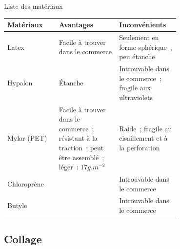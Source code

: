 \begin{frame}{Liste des matériaux}
	\begin{tabular}{|l|p{0.35\linewidth}|p{0.35\linewidth}|}
		\hline
		Matériaux & Avantages & Inconvénients \\
		\hline

		\rowcolor{OrangeT}
		Latex &
		Facile à trouver dans le commerce &
		Seulement en forme sphérique~; peu étanche \\
		\hline

		\rowcolor{RedT}
		Hypalon & Étanche & Introuvable dans le commerce~; fragile aux ultraviolets \\
		\hline

		\rowcolor{GreenT}
		Mylar (PET) &
		Facile à trouver dans le commerce~; résistant à la traction~; peut être assemblé~; léger~: $17 g.m^{-2}$ &
		Raide~; fragile au cisaillement et à la perforation \\
		\hline

		\rowcolor{RedT}
		Chloroprène &
		& Introuvable dans le commerce \\
		\hline

		\rowcolor{RedT}
		Butyle &
		& Introuvable dans le commerce \\
		\hline
	\end{tabular}
\end{frame}

\subsection{Collage}

